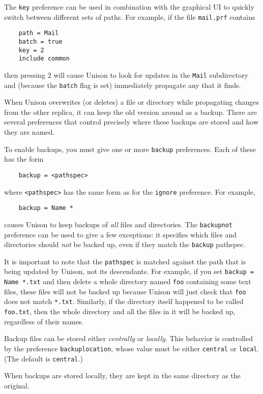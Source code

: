 \documentclass{article}
\begin{document}
The {\tt key} preference can be used in combination with the graphical UI
to quickly switch between different sets of paths.  For example, if the
file {\tt mail.prf} contains
\begin{verbatim}
    path = Mail
    batch = true
    key = 2
    include common
\end{verbatim}
then pressing 2 will cause Unison to look for updates in the {\tt Mail}
subdirectory and (because the {\tt batch} flag is set) immediately
propagate any that it finds.



When Unison overwrites (or deletes) a file or directory while propagating changes from
the other replica, it can keep the old version around as a backup.  There
are several preferences that control precisely where these backups are
stored and how they are named.

To enable backups, you must give one or more \verb|backup| preferences.
Each of these has the form
\begin{verbatim}
    backup = <pathspec>
\end{verbatim}
where \verb|<pathspec>| has the same form as for the \verb|ignore|
preference.  For example,
\begin{verbatim}
    backup = Name *
\end{verbatim}
causes Unison to keep backups of {\em all} files and directories.  The
\verb|backupnot| preference can be used to give a few exceptions: it
specifies which files and directories should {\em not} be backed up, even if
they match the \verb|backup| pathspec.

It is important to note that the \verb|pathspec| is matched against the path
that is being updated by Unison, not its descendants.  For example, if you
set \verb|backup = Name *.txt| and then delete a whole directory named
\verb|foo| containing some text files, these files will not be backed up
because Unison will just check that \verb|foo| does not match \verb|*.txt|.
Similarly, if the directory itself happened to be called \verb|foo.txt|,
then the whole directory and all the files in it will be backed up,
regardless of their names.

Backup files can be stored either {\em centrally} or {\em locally}.  This
behavior is controlled by the preference \verb|backuplocation|, whose value
must be either \verb|central| or \verb|local|.  (The default is
\verb|central|.)

When backups are stored locally, they are kept in the same
directory as the original.
\end{document}
